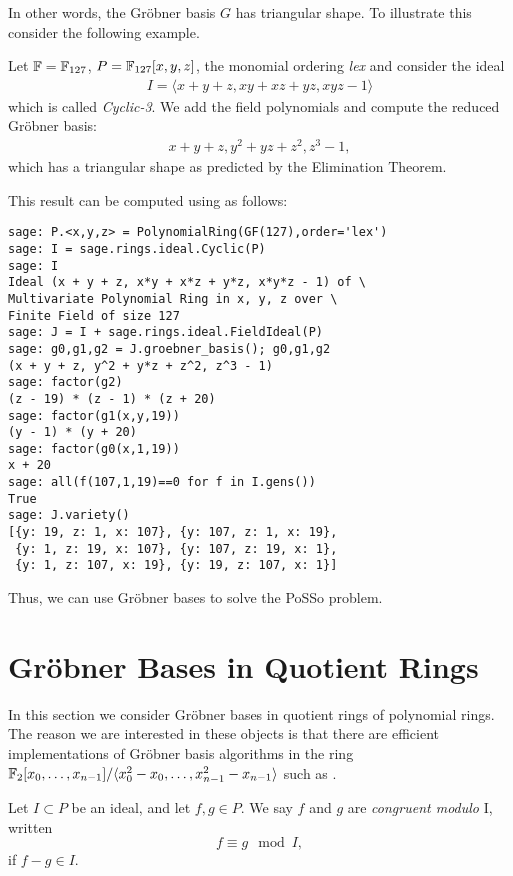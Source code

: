 In other words, the Gröbner basis $G$ has triangular shape. To illustrate this consider the following example.

\begin{example}
Let $\mathbb{F} = \mathbb{F}_{127}$, $P = \mathbb{F}_{127}[x,y,z]$, the monomial ordering \emph{lex} and
consider the ideal
\begin{align*}
I = \langle x + y + z, x y + x z + y z, x y z - 1\rangle
\end{align*}
which is called \emph{Cyclic-3}. We add the field polynomials and compute the reduced Gröbner basis:
\begin{align*}
x + y + z, y^2 + yz + z^2, z^3 - 1,
\end{align*}
which has a triangular shape as predicted by the Elimination Theorem.
\end{example}
This result can be computed using \Sage as follows:

\begin{lstlisting}
sage: P.<x,y,z> = PolynomialRing(GF(127),order='lex')
sage: I = sage.rings.ideal.Cyclic(P)
sage: I
Ideal (x + y + z, x*y + x*z + y*z, x*y*z - 1) of \
Multivariate Polynomial Ring in x, y, z over \
Finite Field of size 127
sage: J = I + sage.rings.ideal.FieldIdeal(P)
sage: g0,g1,g2 = J.groebner_basis(); g0,g1,g2
(x + y + z, y^2 + y*z + z^2, z^3 - 1)
sage: factor(g2)
(z - 19) * (z - 1) * (z + 20)
sage: factor(g1(x,y,19))
(y - 1) * (y + 20)
sage: factor(g0(x,1,19))
x + 20
sage: all(f(107,1,19)==0 for f in I.gens())
True
sage: J.variety()
[{y: 19, z: 1, x: 107}, {y: 107, z: 1, x: 19}, 
 {y: 1, z: 19, x: 107}, {y: 107, z: 19, x: 1}, 
 {y: 1, z: 107, x: 19}, {y: 19, z: 107, x: 1}]
\end{lstlisting}

Thus, we can use Gröbner bases to solve the PoSSo problem.

\section{Gröbner Bases in Quotient Rings}
In this section we consider Gröbner bases in quotient rings of polynomial rings. The reason we are interested in these objects is that there are efficient implementations of Gröbner basis algorithms in the ring $\mathbb{F}_2[x_0,\dots,x_{n-1}]/\langle {x_0^2 - x_0,\dots,x_{n-1}^2 - x_{n-1}} \rangle$ such as \PolyBoRi.

\begin{definition}
Let $I \subset P$ be an ideal, and let $f,g \in P$. We say $f$ and $g$ are \emph{congruent modulo} I, written
\[ f \equiv g \mod I,\] if $f - g \in I$.
\end{definition}

